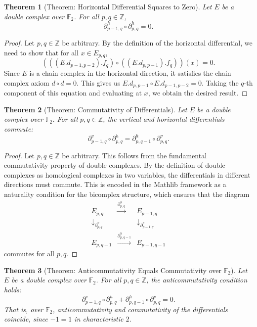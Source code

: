 \documentclass[11pt]{article}
\theoremstyle{plain}
\newtheorem*{theorem}{Theorem}
\theoremstyle{definition}
\theoremstyle{remark}
\begin{document}
\begin{theorem}[Theorem: Horizontal Differential Squares to Zero]
Let $E$ be a double complex over $\mathbb{F}_2$. For all $p, q \in \mathbb{Z}$,
\[
  \partial^h_{p-1,q} \circ \partial^h_{p,q} = 0.
\]
\end{theorem}

\begin{proof}
Let $p, q \in \mathbb{Z}$ be arbitrary. By the definition of the horizontal differential, we need to show that for all $x \in E_{p,q}$,
\[
  (((E.d_{p-1,p-2}).f_q) \circ ((E.d_{p,p-1}).f_q))(x) = 0.
\]
Since $E$ is a chain complex in the horizontal direction, it satisfies the chain complex axiom $d \circ d = 0$. This gives us $E.d_{p,p-1} \circ E.d_{p-1,p-2} = 0$. Taking the $q$-th component of this equation and evaluating at $x$, we obtain the desired result.
\end{proof}

\begin{theorem}[Theorem: Commutativity of Differentials]
Let $E$ be a double complex over $\mathbb{F}_2$. For all $p, q \in \mathbb{Z}$, the vertical and horizontal differentials commute:
\[
  \partial^v_{p-1,q} \circ \partial^h_{p,q} = \partial^h_{p,q-1} \circ \partial^v_{p,q}.
\]
\end{theorem}

\begin{proof}
Let $p, q \in \mathbb{Z}$ be arbitrary. This follows from the fundamental commutativity property of double complexes. By the definition of double complexes as homological complexes in two variables, the differentials in different directions must commute. This is encoded in the Mathlib framework as a naturality condition for the bicomplex structure, which ensures that the diagram
\[
\begin{array}{ccc}
E_{p,q} & \xrightarrow{\partial^h_{p,q}} & E_{p-1,q} \\
\downarrow_{\partial^v_{p,q}} & & \downarrow_{\partial^v_{p-1,q}} \\
E_{p,q-1} & \xrightarrow{\partial^h_{p,q-1}} & E_{p-1,q-1}
\end{array}
\]
commutes for all $p, q$.
\end{proof}

\begin{theorem}[Theorem: Anticommutativity Equals Commutativity over $\mathbb{F}_2$]
Let $E$ be a double complex over $\mathbb{F}_2$. For all $p, q \in \mathbb{Z}$, the anticommutativity condition holds:
\[
  \partial^v_{p-1,q} \circ \partial^h_{p,q} + \partial^h_{p,q-1} \circ \partial^v_{p,q} = 0.
\]
That is, over $\mathbb{F}_2$, anticommutativity and commutativity of the differentials coincide, since $-1 = 1$ in characteristic $2$.
\end{theorem}
\end{document}
